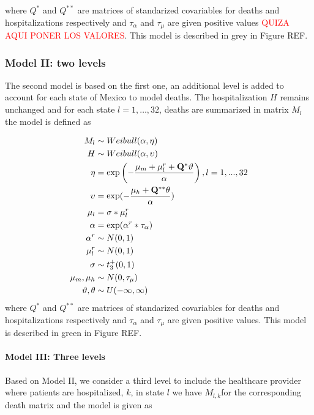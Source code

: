 \documentclass[10pt,letterpaper]{article}
\begin{document}
where \(Q^*\) and \(Q^{**}\) are matrices of standarized covariables for
deaths and hospitalizations respectively and \(\tau_\alpha\) and
\(\tau_{\mu}\) are given positive values
\textcolor{red}{QUIZA AQUI PONER LOS VALORES}. This model is described
in grey in Figure REF.

\subsubsection{Model II: two levels}\label{model-ii-two-levels}

The second model is based on the first one, an additional level is added
to account for each state of Mexico to model deaths. The hospitalization
\(H\) remains unchanged and for each state \(l= 1,\ldots, 32\), deaths
are summarized in matrix \(M_{l}\) the model is defined as

\[
\begin{aligned}
 M_l   &\sim Weibull(\alpha,\mathbf{\eta})\\
 H  &\sim Weibull(\alpha,\mathbf{\upsilon}) \\
 \mathbf{\eta} &= \exp\left(-\frac{\mu_m+\mathbf{\mu}_l^r+\mathbf{Q}^*\mathbf{\vartheta}}{\alpha}\right),\space\space l=1,...,32\\
 \mathbf{\upsilon} &= \exp(-\frac{\mu_h+\mathbf{Q}^{**}\mathbf{\theta}}{\alpha}) \\
 \mathbf{\mu}_l&=\sigma*\mathbf{\mu}_l^r \\
 \alpha&=\exp(\alpha^r*\tau_\alpha) \\
 \alpha^r&\sim N(0,1) \\
 \mu^r_l&\sim N(0,1) \\
 \sigma&\sim t^+_3(0,1) \\
 \mu_m,\mu_h &\sim N(0,\tau_\mu) \\
 \mathbf{\vartheta},\mathbf{\theta} &\sim U(-\infty,\infty) \\
\end{aligned}
\] where \(Q^*\) and \(Q^{**}\) are matrices of standarized covariables
for deaths and hospitalizations respectively and \(\tau_\alpha\) and
\(\tau_{\mu}\) are given positive values. This model is described in
green in Figure REF.

\paragraph{Model III: Three levels}\label{model-iii-three-levels}

Based on Model II, we consider a third level to include the healthcare
provider where patients are hospitalized, \(k\), in state \(l\) we have
\(M_{l,k}\)for the corresponding death matrix and the model is given as
\end{document}
